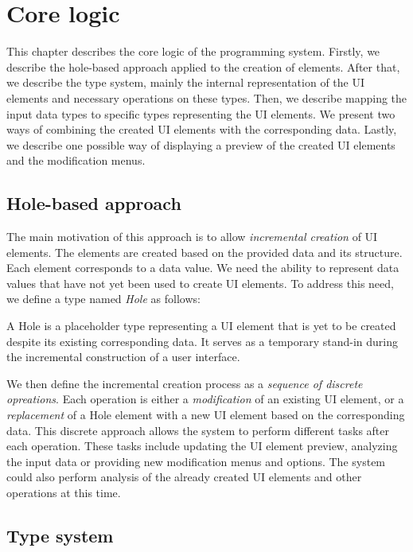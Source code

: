 \chapter{Core logic}
\label{chap:corelogic}

This chapter describes the core logic of the programming system.
Firstly, we describe the hole-based approach applied to the creation of elements.
After that, we describe the type system, mainly the internal representation of the UI elements and necessary operations on these types.
Then, we describe mapping the input data types to specific types representing the UI elements.
We present two ways of combining the created UI elements with the corresponding data.
Lastly, we describe one possible way of displaying a preview of the created UI elements and the modification menus.

\section{Hole-based approach}
The main motivation of this approach is to allow \emph{incremental creation} of UI elements.
The elements are created based on the provided data and its structure.
Each element corresponds to a data value.
We need the ability to represent data values that have not yet been used to create UI elements.
To address this need, we define a type named \emph{Hole} as follows:
\begin{defn}
	A Hole is a placeholder type representing a UI element that is yet to be created despite its existing corresponding data. It serves as a temporary stand-in during the incremental construction of a user interface.
\end{defn}

We then define the incremental creation process as a \emph{sequence of discrete opreations}.
Each operation is either a \emph{modification} of an existing UI element, or a \emph{replacement} of a Hole element with a new UI element based on the corresponding data.
This discrete approach allows the system to perform different tasks after each operation.
These tasks include updating the UI element preview, analyzing the input data or providing new modification menus and options.
The system could also perform analysis of the already created UI elements and other operations at this time.


\section{Type system}

